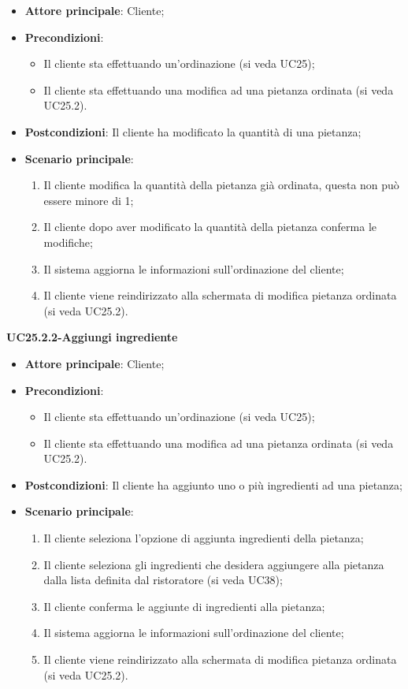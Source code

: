 \begin{itemize}
\item \textbf{Attore principale}: Cliente;
\item \textbf{Precondizioni}:
\begin{itemize}
\item Il cliente sta effettuando un'ordinazione (si veda UC25);
\item Il cliente sta effettuando una modifica ad una pietanza ordinata (si veda UC25.2).
\end{itemize}
\item \textbf{Postcondizioni}: Il cliente ha modificato la quantità di una pietanza;
\item \textbf{Scenario principale}:
\begin{enumerate}
\item Il cliente modifica la quantità della pietanza già ordinata, questa non può essere minore di 1;
\item Il cliente dopo aver modificato la quantità della pietanza conferma le modifiche;
\item Il sistema aggiorna le informazioni sull'ordinazione del cliente;
\item Il cliente viene reindirizzato alla schermata di modifica pietanza ordinata (si veda UC25.2).
\end{enumerate}
\end{itemize}

\textbf{UC25.2.2-Aggiungi ingrediente}

\begin{itemize}
\item \textbf{Attore principale}: Cliente;
\item \textbf{Precondizioni}:
\begin{itemize}
\item Il cliente sta effettuando un'ordinazione (si veda UC25);
\item Il cliente sta effettuando una modifica ad una pietanza ordinata (si veda UC25.2).
\end{itemize}
\item \textbf{Postcondizioni}: Il cliente ha aggiunto uno o più ingredienti ad una pietanza;
\item \textbf{Scenario principale}:
\begin{enumerate}
\item Il cliente seleziona l'opzione di aggiunta ingredienti della pietanza;
\item Il cliente seleziona gli ingredienti che desidera aggiungere alla pietanza dalla lista definita dal ristoratore (si veda UC38);
\item Il cliente conferma le aggiunte di ingredienti alla pietanza;
\item Il sistema aggiorna le informazioni sull'ordinazione del cliente;
\item Il cliente viene reindirizzato alla schermata di modifica pietanza ordinata (si veda UC25.2).
\end{enumerate}
\end{itemize}

